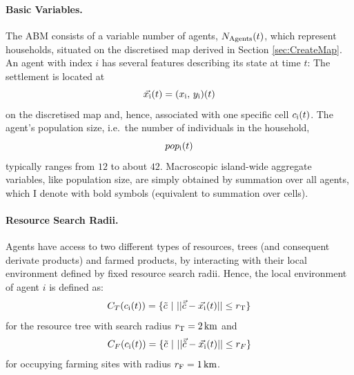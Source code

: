 \paragraph{Basic Variables.}
The ABM consists of a variable number of agents, $N_{\rm Agents}(t)$, which represent households, situated on the discretised map derived in Section \ref{sec:CreateMap}.
An agent with index $i$ has several features describing its state at time $t$:
The settlement is located at 
\begin{equation}
	\vec{x_{\rm i}}(t) = (x_{\rm i},\, y_{\rm i})(t)
\end{equation}
 on the discretised map and, hence, associated with one specific cell $c_{\rm i}(t)$.
 The agent's population size, i.e.\ the number of individuals in the household, 
 \begin{equation}pop_{\rm i}(t) \end{equation}
typically ranges from $12$ to about $42$. %
Macroscopic island-wide aggregate variables, like population size, are simply obtained by summation over all agents, which I denote with bold symbols (equivalent to summation over cells). 

\paragraph{Resource Search Radii.}
Agents have access to two different types of resources, trees (and consequent derivate products) and farmed products, by interacting with their local environment defined by fixed resource search radii.
Hence, the local environment of agent $i$ is defined as:
\begin{equation} \label{eq:Circle_T}
C_{T}(c_{\rm i}(t)) = \{ \tilde{c}\ | \   | |  \vec{\tilde{c}} - \vec{x_{\rm i}}(t) | |  \leq r_{\rm T} \} 
\end{equation}
for the resource tree with search radius $r_{\rm T} =2\, {\rm km}$ and 
\begin{equation} \label{eq:Circle_F}
C_{F}(c_{\rm i}(t)) = \{ \tilde{c}\ | \   | |  \vec{\tilde{c}} - \vec{x_{\rm i}}(t) | |  \leq r_{F} \}
\end{equation}
for occupying farming sites with radius $r_{\rm F} = 1\, {\rm km}$.

